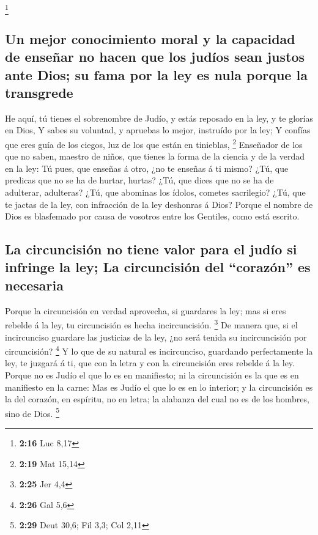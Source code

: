 \footnote{\textbf{2:16} Luc 8,17}

\hypertarget{un-mejor-conocimiento-moral-y-la-capacidad-de-enseuxf1ar-no-hacen-que-los-juduxedos-sean-justos-ante-dios-su-fama-por-la-ley-es-nula-porque-la-transgrede}{%
\subsection{Un mejor conocimiento moral y la capacidad de enseñar no
hacen que los judíos sean justos ante Dios; su fama por la ley es nula
porque la
transgrede}\label{un-mejor-conocimiento-moral-y-la-capacidad-de-enseuxf1ar-no-hacen-que-los-juduxedos-sean-justos-ante-dios-su-fama-por-la-ley-es-nula-porque-la-transgrede}}

 He aquí, tú tienes el sobrenombre de Judío, y estás
reposado en la ley, y te glorías en Dios,  Y sabes su
voluntad, y apruebas lo mejor, instruído por la ley;  Y
confías que eres guía de los ciegos, luz de los que están en tinieblas,
\footnote{\textbf{2:19} Mat 15,14}  Enseñador de los que no
saben, maestro de niños, que tienes la forma de la ciencia y de la
verdad en la ley:  Tú pues, que enseñas á otro, ¿no te
enseñas á ti mismo? ¿Tú, que predicas que no se ha de hurtar, hurtas?
 ¿Tú, que dices que no se ha de adulterar, adulteras? ¿Tú,
que abominas los ídolos, cometes sacrilegio?  ¿Tú, que te
jactas de la ley, con infracción de la ley deshonras á Dios?
 Porque el nombre de Dios es blasfemado por causa de
vosotros entre los Gentiles, como está escrito.

\hypertarget{la-circuncisiuxf3n-no-tiene-valor-para-el-juduxedo-si-infringe-la-ley-la-circuncisiuxf3n-del-corazuxf3n-es-necesaria}{%
\subsection{La circuncisión no tiene valor para el judío si infringe la
ley; La circuncisión del ``corazón'' es
necesaria}\label{la-circuncisiuxf3n-no-tiene-valor-para-el-juduxedo-si-infringe-la-ley-la-circuncisiuxf3n-del-corazuxf3n-es-necesaria}}

 Porque la circuncisión en verdad aprovecha, si guardares
la ley; mas si eres rebelde á la ley, tu circuncisión es hecha
incircuncisión. \footnote{\textbf{2:25} Jer 4,4}  De manera
que, si el incircunciso guardare las justicias de la ley, ¿no será
tenida su incircuncisión por circuncisión? \footnote{\textbf{2:26} Gal
  5,6}  Y lo que de su natural es incircunciso, guardando
perfectamente la ley, te juzgará á ti, que con la letra y con la
circuncisión eres rebelde á la ley.  Porque no es Judío el
que lo es en manifiesto; ni la circuncisión es la que es en manifiesto
en la carne:  Mas es Judío el que lo es en lo interior; y
la circuncisión es la del corazón, en espíritu, no en letra; la alabanza
del cual no es de los hombres, sino de Dios. \footnote{\textbf{2:29}
  Deut 30,6; Fil 3,3; Col 2,11}


